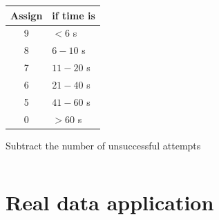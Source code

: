 \documentclass{beamer}
\begin{document}
\begin{frame}
\begin{columns}[T]
\begin{column}{.50\linewidth}
			\begin{tabular}{cl}
				\hline
				Assign & if time is\\
				\hline
				9 & $<6$ s \\
				8 & $6-10$ s \\
				7 & $11-20$ s \\
				6 & $21-40$ s \\
				5 & $41-60$ s \\
				0 & $>60$ s \\
				\hline
			\end{tabular}
			\vspace{1.5mm}
			
			Subtract the number of unsuccessful attempts
	\end{column}
\end{columns}
\end{frame}



\section{Real data application}
	
\end{document}
